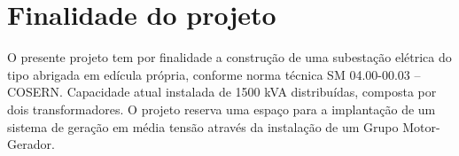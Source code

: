 \section{Finalidade do projeto}
O presente projeto tem por finalidade a construção de uma subestação elétrica do tipo abrigada em
edícula própria, conforme norma técnica SM 04.00-00.03 – COSERN. Capacidade atual instalada de 1500
kVA distribuídas, composta por dois transformadores. O projeto reserva uma espaço para a implantação de um
sistema de geração em média tensão através da instalação de um Grupo Motor-Gerador.